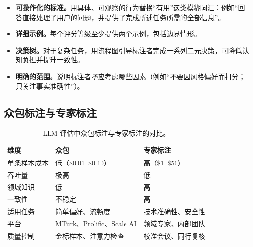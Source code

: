 \begin{itemize}
  \item \textbf{可操作化的标准。}用具体、可观察的行为替换“有用”这类模糊词汇：例如“回答直接处理了用户的问题，并提供了完成所述任务所需的全部信息”。
  \item \textbf{详细示例。}每个评分等级至少提供两个示例，包括边界情形。
  \item \textbf{决策树。}对于复杂任务，用流程图引导标注者完成一系列二元决策，可降低认知负担并提升一致性。
  \item \textbf{明确的范围。}说明标注者\emph{不}应考虑哪些因素（例如“不要因风格偏好而扣分；只关注事实准确性”）。
\end{itemize}

\subsection{众包标注与专家标注}
\label{crowdsourcing-vs.-expert-annotation}

\begin{table}[ht!]
\centering\small
\caption{LLM 评估中众包标注与专家标注的对比。}
\begin{tabular}{@{}l l l@{}}
\toprule
\textbf{维度} & \textbf{众包} & \textbf{专家标注} \\
\midrule
单条样本成本 & 低（\$0.01--\$0.10） & 高（\$1--\$50） \\
吞吐量 & 极高 & 低 \\
领域知识 & 低 & 高 \\
一致性 & 不稳定 & 高 \\
适用任务 & 简单偏好、流畅度 & 技术准确性、安全性 \\
平台 & MTurk、Prolific、Scale AI & 领域专家、内部团队 \\
质量控制 & 金标样本、注意力检查 & 校准会议、同行复核 \\
\bottomrule
\end{tabular}
\end{table}

